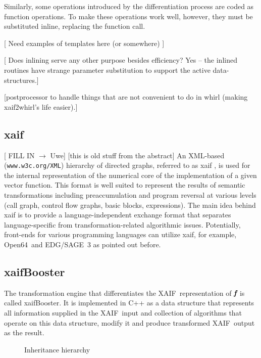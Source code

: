 \documentclass[acmtocl,acmnow]{acmtrans2m}
\newcommand{\OpenSixtyFour}{Open64}
\newcommand{\xaif}{XAIF}
\newcommand{\xaifBooster}{xaifBooster}
\newcommand{\bmf}{\mbox{\bf\em f}}
\begin{document}
Similarly, some operations introduced by the differentiation process
are coded as function operations. To make these operations work well,
however, they must be substituted inline, replacing the function call.

{\color{Red}
[ Need examples of templates here (or somewhere) ]

[ Does inlining serve any other purpose besides efficiency?  Yes --
the inlined routines have strange parameter substitution to support
the active data-structures.]

[postprocessor to handle things that are not convenient to do in whirl
(making xaif2whirl's life easier).]
}

\subsection{xaif} \label{ssec:xaif}
{\color{Red} [ FILL IN $\to$ Uwe] } 
{\color{Blue} [this is old stuff from the abstract] 
An XML-based ({\tt www.w3c.org/XML}) hierarchy of directed graphs, referred to as xaif 
\cite{HNN02}, is used for the 
internal representation of the numerical core of the implementation
of a given vector function. This format is 
well suited to represent the results of  semantic transformations including 
preaccumulation \cite{BiHa96,CDB96,GrRe91} and 
program reversal \cite{Gri92,WaGr01} at various levels (call graph, control 
flow graphs, basic blocks, expressions). 
The main idea behind xaif is to provide a language-independent exchange
format that separates language-specific from transformation-related 
algorithmic issues. Potentially, front-ends for various programming languages 
can utilize xaif, for example, \OpenSixtyFour\ and EDG/SAGE~3 as pointed out before.
}
\subsection{\xaifBooster} 
The transformation engine that differentiates the \xaif\ representation of 
$\bmf$ is called \xaifBooster. It is implemented in C++ as a 
data structure that represents all information supplied in the \xaif\ input 
and collection of algorithms that operate on this data structure, modify 
it and produce transformed  \xaif\ output as the result. 

\begin{figure}
\centering {}
\caption{Inheritance hierarchy} \label{fig:iri}
\end{figure}
\end{document}
